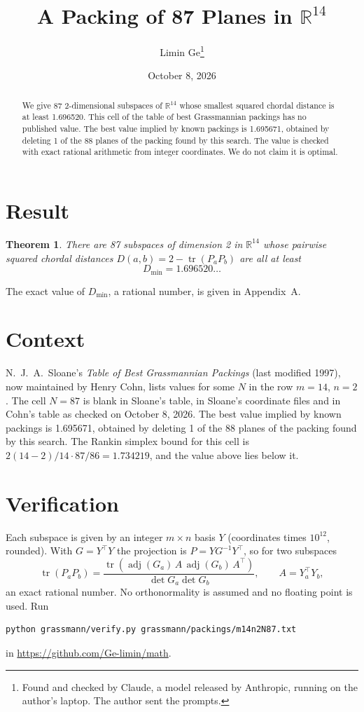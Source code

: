\documentclass[11pt,a4paper]{article}
\title{A Packing of 87 Planes in $\mathbb{R}^{14}$}
\author{Limin Ge\thanks{Found and checked by Claude, a model released by Anthropic, running on the author's laptop. The author sent the prompts.}}
\date{October 8, 2026}
\newtheorem*{theorem}{Theorem}
\begin{document}
\maketitle
\begin{abstract}
We give 87 2-dimensional subspaces of $\mathbb{R}^{14}$ whose smallest squared chordal distance is at least 1.696520. This cell of the table of best Grassmannian packings has no published value. The best value implied by known packings is 1.695671, obtained by deleting 1 of the 88 planes of the packing found by this search. The value is checked with exact rational arithmetic from integer coordinates. We do not claim it is optimal.
\end{abstract}

\section{Result}
\begin{theorem}
There are 87 subspaces of dimension 2 in $\mathbb{R}^{14}$ whose pairwise squared chordal distances $D(a,b) = 2 - \operatorname{tr}(P_aP_b)$ are all at least
\[ D_{\min} = 1.696520\ldots \]
\end{theorem}
The exact value of $D_{\min}$, a rational number, is given in Appendix~A.


\section{Context}
N.~J.~A.~Sloane's \emph{Table of Best Grassmannian Packings} (last modified 1997), now maintained by Henry Cohn, lists values for some $N$ in the row $m=14$, $n=2$. The cell $N=87$ is blank in Sloane's table, in Sloane's coordinate files and in Cohn's table as checked on October 8, 2026. The best value implied by known packings is 1.695671, obtained by deleting 1 of the 88 planes of the packing found by this search. The Rankin simplex bound for this cell is $2(14-2)/14\cdot 87/86 = 1.734219$, and the value above lies below it.


\section{Verification}
Each subspace is given by an integer $m\times n$ basis $Y$ (coordinates times $10^{12}$, rounded). With $G=Y^\top Y$ the projection is $P=YG^{-1}Y^\top$, so for two subspaces
\[ \operatorname{tr}(P_aP_b)=\frac{\operatorname{tr}(\operatorname{adj}(G_a)\,A\,\operatorname{adj}(G_b)\,A^\top)}{\det G_a\det G_b},\qquad A=Y_a^\top Y_b, \]
an exact rational number. No orthonormality is assumed and no floating point is used. Run
\begin{verbatim}
python grassmann/verify.py grassmann/packings/m14n2N87.txt
\end{verbatim}
in \url{https://github.com/Ge-limin/math}.
\end{document}
